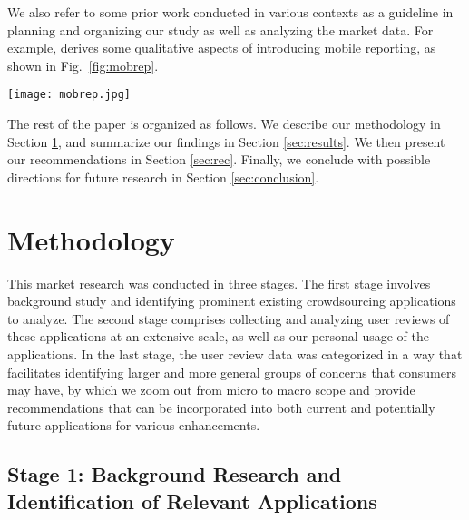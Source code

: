 \documentclass[conference,10pt]{IEEEtran}
\begin{document}
We also refer to some prior work conducted in various contexts as a guideline in planning and organizing our study as well as analyzing the market data. For example, \cite{mobrep12} derives some qualitative aspects of introducing mobile reporting, as shown in Fig.~\ref{fig:mobrep}.
\begin{figure*}[tb]
\centering
\texttt{[image: mobrep.jpg]}
\caption{Qualitative aspects of introducing mobile reporting.\cite{mobrep12}}
\label{fig:mobrep}
\end{figure*}

The rest of the paper is organized as follows. We describe our methodology in Section \ref{sec:model}, and summarize our findings in Section \ref{sec:results}. We then present our recommendations in Section \ref{sec:rec}. Finally, we conclude with possible directions for future research in Section \ref{sec:conclusion}.


\section{Methodology}\label{sec:model}

This market research was conducted in three stages. The first stage involves background study and identifying prominent existing crowdsourcing applications to analyze. The second stage comprises collecting and analyzing user reviews of these applications at an extensive scale, as well as our personal usage of the applications. In the last stage, the user review data was categorized in a way that facilitates identifying larger and more general groups of concerns that consumers may have, by which we zoom out from micro to macro scope and provide recommendations that can be incorporated into both current and potentially future applications for various enhancements.

\subsection{Stage 1: Background Research and Identification of Relevant Applications}\label{sec:ups}
\end{document}
